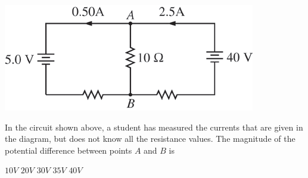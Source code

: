 \begin{center}
\includegraphics[scale=0.5]{images/img-002-002.png}
\end{center}

\begin{questions}\setcounter{question}{1}\question
In the circuit shown above, a student has measured the currents that are given in the diagram, but does not know all the resistance values. The magnitude of the potential difference between points $A$ and $B$ is

\begin{oneparchoices}
\choice $10 \unit{V}$
\choice $20 \unit{V}$
\choice $30 \unit{V}$
\choice $35 \unit{V}$
\choice $40 \unit{V}$
\end{oneparchoices}\end{questions}

